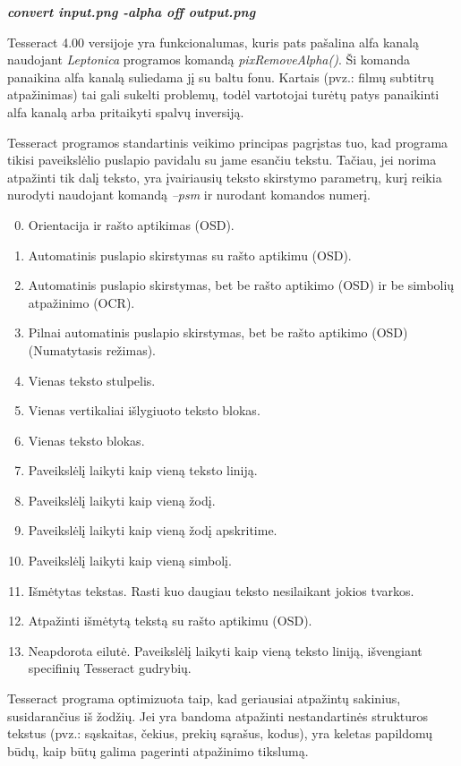 \documentclass{VUMIFInfBakalaurinis}
\begin{document}
\textbf{\textit{convert input.png -alpha off output.png}}

Tesseract 4.00 versijoje yra funkcionalumas, kuris pats pašalina alfa kanalą naudojant \textit{Leptonica} programos komandą \textit{pixRemoveAlpha()}. Ši komanda panaikina alfa kanalą
suliedama jį su baltu fonu. Kartais (pvz.: filmų subtitrų atpažinimas) tai gali sukelti problemų, todėl vartotojai turėtų patys panaikinti alfa kanalą arba pritaikyti spalvų inversiją.

Tesseract programos standartinis veikimo principas pagrįstas tuo, kad programa tikisi paveikslėlio puslapio
pavidalu su jame esančiu tekstu. Tačiau, jei norima atpažinti tik dalį teksto, yra įvairiausių teksto skirstymo 
parametrų, kurį reikia nurodyti naudojant komandą \textit{--psm} ir nurodant komandos numerį.

\begin{enumerate}[itemsep=0.5pt]
  \setcounter{enumi}{-1}
  \item Orientacija ir rašto aptikimas (OSD).
  \item Automatinis puslapio skirstymas su rašto aptikimu (OSD).
  \item Automatinis puslapio skirstymas, bet be rašto aptikimo (OSD) ir be simbolių atpažinimo (OCR).
  \item Pilnai automatinis puslapio skirstymas, bet be rašto aptikimo (OSD) (Numatytasis režimas).
  \item Vienas teksto stulpelis.
  \item Vienas vertikaliai išlygiuoto teksto blokas.
  \item Vienas teksto blokas.
  \item Paveikslėlį laikyti kaip vieną teksto liniją.
  \item Paveikslėlį laikyti kaip vieną žodį.
  \item Paveikslėlį laikyti kaip vieną žodį apskritime.
  \item Paveikslėlį laikyti kaip vieną simbolį.
  \item Išmėtytas tekstas. Rasti kuo daugiau teksto nesilaikant jokios tvarkos.
  \item Atpažinti išmėtytą tekstą su rašto aptikimu (OSD).
  \item Neapdorota eilutė. Paveikslėlį laikyti kaip vieną teksto liniją, išvengiant specifinių Tesseract gudrybių.
\end{enumerate}

Tesseract programa optimizuota taip, kad geriausiai atpažintų sakinius, susidarančius iš žodžių. 
Jei yra bandoma atpažinti nestandartinės strukturos tekstus (pvz.: sąskaitas, čekius, prekių sąrašus, kodus), yra keletas papildomų 
būdų, kaip būtų galima pagerinti atpažinimo tikslumą.
\end{document}

